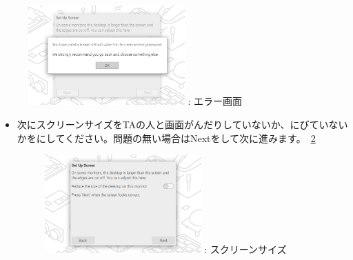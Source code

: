 \documentclass[a4paper,12pt]{jarticle}
\begin{document}
\begin{enumerate}
\begin{itemize}
\begin{figure}[h]
\begin{minipage}{5.228cm}
{                            \includegraphics[width=6.000cm]{sw_image04.png}
                            \newline
                            {\theFigure\label{seq:refFigure14}}:
                            エラー画面}
                        \end{minipage}
                      \end{figure}
                \end{itemize}
                \begin{itemize}
                  \item
                        次にスクリーンサイズをTAの人と画面がんだりしていないか、にびていないかをにしてください。問題の無い場合はNextをして次に進みます。~\ref{seq:refFigure15}
                        \begin{figure}[h]
                          \centering
                          \begin{minipage}{5.228cm}
                            {\upshape
                              \includegraphics[width=6.000cm]{sw_image05.png}
                              \newline
                              {\theFigure\label{seq:refFigure15}}:
                              スクリーンサイズ}
                          \end{minipage}
                        \end{figure}
                      \end{itemize}  
                      
  \clearpage                   

\end{enumerate}
\end{document}

